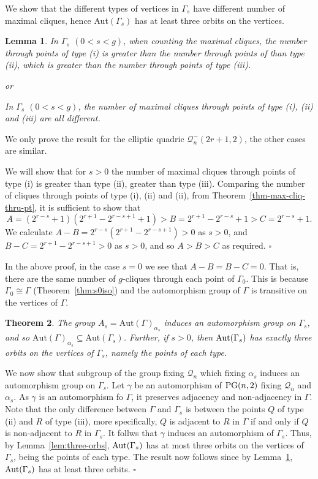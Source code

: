 \documentclass[12pt]{article}
\newtheorem{theorem}{Theorem}[section]
\newtheorem{lemma}[theorem]{Lemma}
\newenvironment{proof}{\noindent{\bf Proof}\hspace{0.5em}}
    { \null  \hfill $\square$ \par}
\newcommand{\Q}{\mathscr Q}
\newcommand\PG{{\rm PG}}
\newcommand{\Label}{\label}
\newcommand\red[1]{{\color{red} #1}}
\begin{document}
We show that the different types of vertices in $\Gamma_s$ have different number of maximal cliques, hence {\rm Aut}$(\Gamma_s)$ has at least three orbits on the vertices. 

\begin{lemma}\Label{lem:diffcliq}
In $\Gamma_s$ $(0<s<g)$, when counting the maximal cliques, the number  through points of type (i) is greater than the number through points of than type (ii), which is greater than the number through points of type (iii).

or

\red{In $\Gamma_s$ $(0<s<g)$, the number of maximal cliques through points of type (i), (ii) and (iii) are all different.}
\end{lemma}
\begin{proof}
We only prove the result for the elliptic quadric $\Q_n^-(2r+1,2)$, the other cases are similar.

 We will show that for $s>0$ the number of maximal cliques through points of type (i) is greater than type (ii), greater than type (iii). 
Comparing the number of cliques through points of type (i), (ii) and (ii), from Theorem~\ref{thm-max-cliq-thru-pt}, it is sufficient to show that
\[
A=(2^{r-s}+1)(2^{r+1}-2^{r-s+1}+1) > B=2^{r+1}-2^{r-s}+1
> C=2^{r-s}+1.
\]
We calculate $A-B=2^{r-s}(2^{r+1}-2^{r-s+1})>0$ as $s>0$, and  $B-C=2^{r+1}-2^{r-s+1}>0$ as $s>0$, and so $A>B>C$ as required.
\end{proof}

In the above proof, in the case $s=0$ we see that $A-B=B-C=0$. That is, there are the same number of $g$-cliques through each point of $\Gamma_0$.  This is because $\Gamma_0\cong\Gamma$ (Theorem~\ref{thm:s0iso}) and the automorphism group of $\Gamma$ is transitive on the vertices of $\Gamma$.


\begin{theorem}\Label{thm:3-orbit} The group $A_s=\mbox{Aut}(\Gamma)_{\alpha_s}$ induces an automorphism group on $\Gamma_s$, and so $\mbox{Aut}(\Gamma)_{\alpha_s}\subseteq\mbox{Aut}(\Gamma_s)$. Further, if $s>0$, then ${\rm Aut}(\Gamma_s)$ has exactly three orbits on the vertices of $\Gamma_s$, namely the points of each type.
\end{theorem}
\begin{proof} 
We now show that subgroup of the group fixing $\Q_n$ which fixing $\alpha_s$ induces an automorphism group on $\Gamma_s$.  Let $\gamma$ be an automorphism of $\PG(n,2)$   fixing $\Q_n$ and $\alpha_s$. As $\gamma$ is an automorphism fo $\Gamma$, it preserves adjacency and non-adjacency in $\Gamma$.  Note that the only difference between $\Gamma$ and $\Gamma_s$ is between the points $Q$ of type (ii) and $R$ of type (iii), more specifically, $Q$ is adjacent to $R$ in $\Gamma$ if and only if $Q$ is non-adjacent to $R$ in $\Gamma_s$. It follws that $\gamma$ induces an automorphism of $\Gamma_s$.  Thus, by Lemma~\ref{lem:three-orbs}, ${\rm Aut}(\Gamma_s)$ has at most three orbits on the vertices of $\Gamma_s$, being the points of each type. The result now follows since by Lemma~\ref{lem:diffcliq}, ${\rm Aut}(\Gamma_s)$ has at least three orbits.   
 \end{proof}
\end{document}
